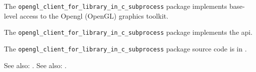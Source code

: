 
The {\tt opengl\_client\_for\_library\_in\_c\_subprocess} package implements base-level access to the Opengl (OpenGL) graphics
toolkit.

The {\tt opengl\_client\_for\_library\_in\_c\_subprocess} package implements the  api.

The {\tt opengl\_client\_for\_library\_in\_c\_subprocess} package source code is in .

See also:  .
See also:  .


